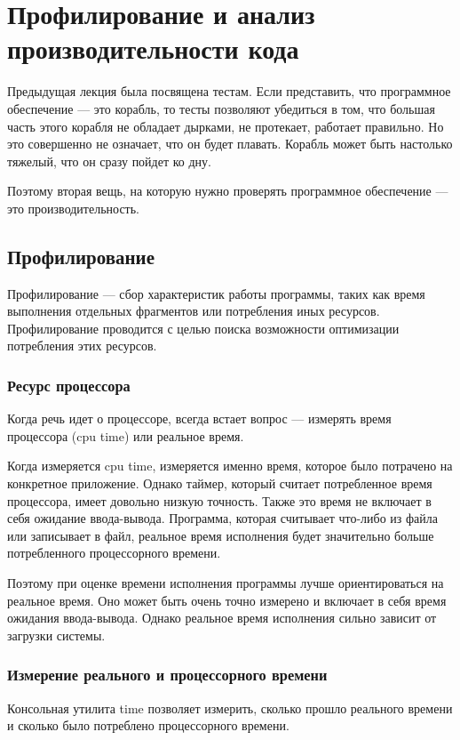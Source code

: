\setcounter{chapter}{11}
\chapter{Профилирование и анализ производительности кода}
Предыдущая лекция была посвящена тестам. Если представить, что программное обеспечение --- это корабль, то тесты позволяют убедиться в том, что большая часть этого корабля не обладает дырками, не протекает, работает правильно. Но это совершенно не означает, что он будет плавать. Корабль может быть настолько тяжелый, что он сразу пойдет ко дну.

Поэтому вторая вещь, на которую нужно проверять программное обеспечение --- это производительность.

\section{Профилирование}
Профилирование --- сбор характеристик работы программы, таких как время выполнения отдельных фрагментов или потребления иных ресурсов. Профилирование проводится с целью поиска возможности оптимизации потребления этих ресурсов.


\subsection{Ресурс процессора}
Когда речь идет о процессоре, всегда встает вопрос --- измерять время процессора (cpu time) или реальное время.

Когда измеряется cpu time, измеряется именно время, которое было потрачено на конкретное приложение. Однако таймер, который считает потребленное время процессора, имеет довольно низкую точность. Также это время не включает в себя ожидание ввода-вывода. Программа, которая считывает что-либо из файла или записывает в файл, реальное время исполнения будет значительно больше потребленного процессорного времени.

Поэтому при оценке времени исполнения программы лучше ориентироваться на реальное время. Оно может быть очень точно измерено и включает в себя время ожидания ввода-вывода. Однако реальное время исполнения сильно зависит от загрузки системы.

\subsection{Измерение реального и процессорного времени}
Консольная утилита time позволяет измерить, сколько прошло реального времени и сколько было потреблено процессорного времени.

